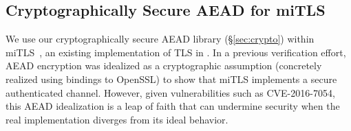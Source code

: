 \documentclass[acmsmall,review,anonymous]{acmart}\settopmatter{printfolios=true}
\begin{document}
\iffalse
\begin{lstlisting}
val crypto_box_easy:
  c:uint8_p -> (* To store the ciphertext *)
  m:uint8_p -> (* Plaintext *)
  mlen:u64{...}  -> (* Plaintext length *)
  n:uint8_p{...} -> (* Nonce *)
  pk:uint8_p{...} -> (* Public Key of the other party *)
  sk:uint8_p{...} -> (* Our private key *)
  Stack u32
    (requires (fun h -> crypto_box_pre h c m mlen c pk sk))
    (ensures  (fun h0 z h1 -> crypto_box_post h0 z h1 c m
                                          mlen c pk sk))
\end{lstlisting}
\fi

\subsection{Cryptographically Secure AEAD for miTLS}
\label{sec:aead}

We use our cryptographically secure AEAD library (\S\ref{sec:crypto})
within miTLS~\cite{mitls}, an existing implementation of TLS in \fstar.
%
In a previous verification effort, AEAD encryption was idealized as a
cryptographic assumption (concretely realized using bindings to
OpenSSL) to show that miTLS implements a secure authenticated channel.
%
However, given vulnerabilities such as CVE-2016-7054, this AEAD
idealization is a leap of faith that can undermine security when the
real implementation diverges from its ideal behavior.

\end{document}

